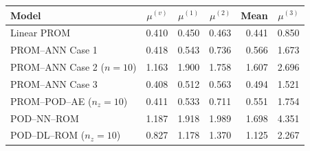 \begin{tabular}{lrrrrr}
\toprule
Model & $\mu^{(v)}$ & $\mu^{(1)}$ & $\mu^{(2)}$ & Mean & $\mu^{(3)}$ \\
\midrule
Linear PROM & 0.410 & 0.450 & 0.463 & 0.441 & 0.850 \\
PROM--ANN Case 1 & 0.418 & 0.543 & 0.736 & 0.566 & 1.673 \\
PROM--ANN Case 2 ($n=10$) & 1.163 & 1.900 & 1.758 & 1.607 & 2.696 \\
PROM--ANN Case 3 & 0.408 & 0.512 & 0.563 & 0.494 & 1.521 \\
PROM--POD--AE ($n_z=10$) & 0.411 & 0.533 & 0.711 & 0.551 & 1.754 \\
\midrule
POD--NN--ROM & 1.187 & 1.918 & 1.989 & 1.698 & 4.351 \\
POD--DL--ROM ($n_z=10$) & 0.827 & 1.178 & 1.370 & 1.125 & 2.267 \\
\bottomrule
\end{tabular}
